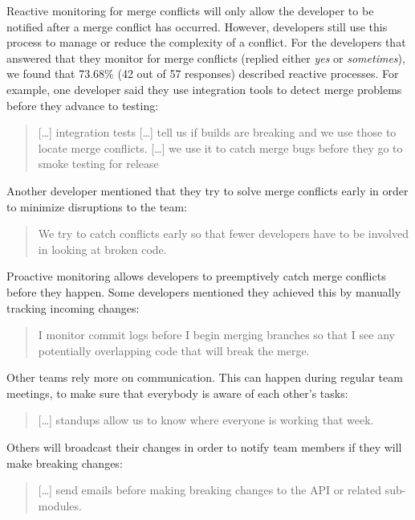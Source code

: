 Reactive monitoring for merge conflicts will only allow the developer to be notified after a merge conflict has occurred.
However, developers still use this process to manage or reduce the complexity of a conflict.
For the developers that answered that they monitor for merge conflicts (replied either \emph{yes} or \emph{sometimes}), we found that 73.68\% (42 out of 57 responses) described reactive processes.
For example, one developer said they use integration tools to detect merge problems before they advance to testing:
\begin{quotation}
	[\ldots] integration tests [\ldots] tell us if builds are breaking and we use those to locate merge conflicts. [\ldots] we use it to catch merge bugs before they go to smoke testing for release
\end{quotation}
Another developer mentioned that they try to solve merge conflicts early in order to minimize disruptions to the team:
\begin{quotation}
	We try to catch conflicts early so that fewer developers have to be involved in looking at broken code.
\end{quotation}

Proactive monitoring allows developers to preemptively catch merge conflicts before they happen.
Some developers mentioned they achieved this by manually tracking incoming changes:
\begin{quotation}
	I monitor commit logs before I begin merging branches so that I see any potentially overlapping code that will break the merge.
\end{quotation}
Other teams rely more on communication.
This can happen during regular team meetings, to make sure that everybody is aware of each other's tasks:
\begin{quotation}
	[\ldots] standups allow us to know where everyone is working that week.
\end{quotation}
Others will broadcast their changes in order to notify team members if they will make breaking changes:
\begin{quotation}
	[\ldots] send emails before making breaking changes to the API or related sub-modules.
\end{quotation}

